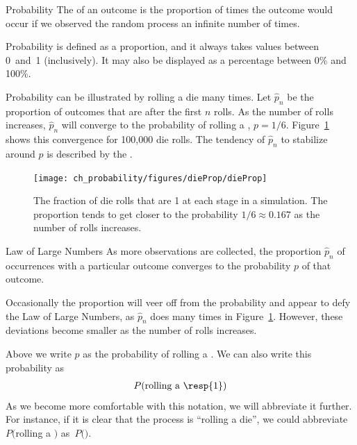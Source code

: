 \begin{onebox}{Probability}
The  of an outcome is the proportion of times the outcome would occur if we observed the random process an infinite number of times.
\end{onebox}

Probability is defined as a proportion, and it always takes values between 0~and~1 (inclusively). It may also be displayed as a percentage between 0\% and 100\%.

Probability can be illustrated by rolling a die many times. Let $\hat{p}_n$ be the proportion of outcomes that are  after the first $n$ rolls. As the number of rolls increases, $\hat{p}_n$ will converge to the probability of rolling a , $p = 1/6$. Figure~\ref{dieProp} shows this convergence for 100,000 die rolls. The tendency of $\hat{p}_n$ to stabilize around $p$ is described by the . 

\begin{figure}[bt]
\centering
\texttt{[image: ch\_probability/figures/dieProp/dieProp]}
\caption{The fraction of die rolls that are 1 at each stage in a simulation. The proportion tends to get closer to the probability $1/6 \approx 0.167$ as the number of rolls increases.}
\label{dieProp}
\end{figure}

\begin{onebox}{Law of Large Numbers}
As more observations are collected, the proportion $\hat{p}_n$ of occurrences with a particular outcome converges to the probability $p$ of that outcome.
\end{onebox}

Occasionally the proportion will veer off from the probability and appear to defy the Law of Large Numbers, as $\hat{p}_n$ does many times in Figure~\ref{dieProp}. However, these deviations become smaller as the number of rolls increases.

Above we write $p$ as the probability of rolling a . We can also write this probability as
\begin{eqnarray*}
P(\text{rolling a \resp{1}})
\end{eqnarray*}
As we become more comfortable with this notation, we will abbreviate it further. For instance, if it is clear that the process is ``rolling a die'', we could abbreviate $P($rolling a $)$ as~$P($$)$. 

